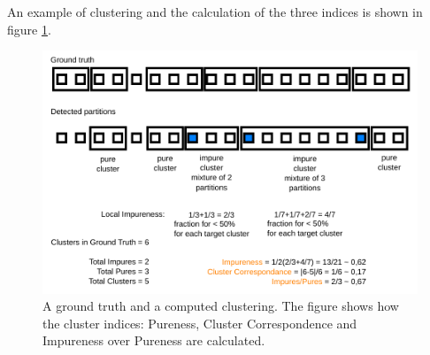 An example of clustering and the calculation of the three indices is shown
in figure \ref{fig-pureness}.
\begin{figure}
  \begin{center}
  \includegraphics[scale=0.9]{pureness.pdf}
  \caption{A ground truth and a computed clustering. The figure shows how
    the cluster indices: Pureness, Cluster Correspondence and
    Impureness over Pureness are calculated.}
  \label{fig-pureness}
  \end{center}
\end{figure}

